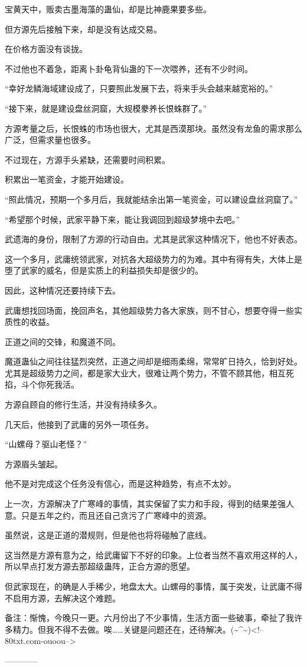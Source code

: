 \begin{this_body}
宝黄天中，贩卖古墨海藻的蛊仙，却是比神鹿果要多些。

但方源先后接触下来，却是没有达成交易。

在价格方面没有谈拢。

不过他也不着急，距离卜卦龟背仙蛊的下一次喂养，还有不少时间。

“幸好龙鳞海域建设成了，只要照此发展下去，将来手头会越来越宽裕的。”

“接下来，就是建设盘丝洞窟，大规模豢养长恨蛛群了。”

方源考量之后，长恨蛛的市场也很大，尤其是西漠那块。虽然没有龙鱼的需求那么广泛，但需求量也很多。

不过现在，方源手头紧缺，还需要时间积累。

积累出一笔资金，才能开始建设。

“照此情况，预期一个多月后，我就能结余出第一笔资金，可以建设盘丝洞窟了。”

“希望那个时候，武家平静下来，能让我调回到超级梦境中去吧。”

武遗海的身份，限制了方源的行动自由。尤其是武家这种情况下，他也不好表态。

这一个多月，武庸统领武家，对抗各大超级势力的为难。其中有得有失，大体上是堕了武家的威名，但是实质上的利益损失却是很少的。

因此，这种情况还要持续下去。

武庸想找回场面，挽回声名，其他超级势力各大家族，则不甘心，想要夺得一些实质性的收益。

正道之间的交锋，和魔道不同。

魔道蛊仙之间往往猛烈突然，正道之间却是细雨柔绵，常常旷日持久，恰到好处。尤其是超级势力之间，都是家大业大，很难让两个势力，不管不顾其他，相互死掐，斗个你死我活。

方源自顾自的修行生活，并没有持续多久。

几天后，他接到了武庸的另外一项任务。

“山螺母？驱山老怪？”

方源眉头皱起。

他不是对完成这个任务没有信心，而是这种趋势，有点不太妙。

上一次，方源解决了广寒峰的事情，其实保留了实力和手段，得到的结果差强人意。只是五年之约，而且还自己贪污了广寒峰中的资源。

虽然说，这是正道的潜规则，但是他也将将碰触了底线。

这当然是方源有意为之，给武庸留下不好的印象。上位者当然不喜欢用这样的人，所以早点打发方源去那超级蛊阵，正合方源的愿望。

但武家现在，的确是人手稀少，地盘太大。山螺母的事情，属于突发，让武庸不得不启用方源，去解决这个难题。

备注：惭愧，今晚只一更。六月份出了不少事情，生活方面一些破事，牵扯了我许多精力。但我不得不去做。唉……关键是问题还在，还待解决。(\~{}\^{}\~{})<!--80txt.com-ouoou-->

------------

\end{this_body}

